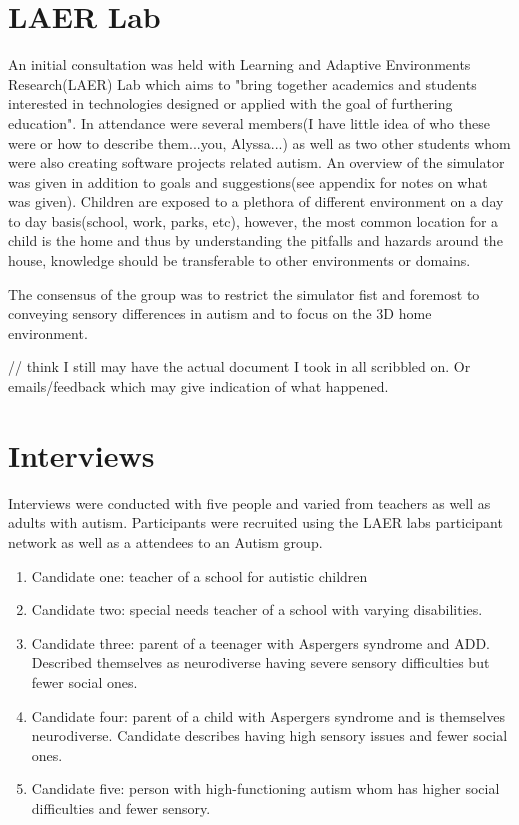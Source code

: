 \documentclass[11pt]{report}
\begin{document}
\section{LAER Lab}
An initial consultation was held with Learning and Adaptive Environments Research(LAER) Lab which aims to "bring together academics and students interested in technologies designed or applied with the goal of furthering education". In attendance were several members(I have little idea of who these were or how to describe them...you, Alyssa...) as well as two other students whom were also creating software projects related autism. An overview of the simulator was given in addition to goals and suggestions(see appendix for notes on what was given). Children are exposed to a plethora of different environment on a day to day basis(school, work, parks, etc), however, the most common location for a child is the home and thus by understanding the pitfalls and hazards around the house, knowledge should be transferable to other environments or domains. 

The consensus of the group was to restrict the simulator fist and foremost to conveying sensory differences in autism and to focus on the 3D home environment.

// think I still may have the actual document I took in all scribbled on. Or emails/feedback which may give indication of what happened.

\section{Interviews}
Interviews were conducted with five people and varied from teachers as well as adults with autism. Participants were recruited using the LAER labs participant network as well as a attendees to an Autism group.

\begin{enumerate}
\item Candidate one: teacher of a school for autistic children
\item Candidate two: special needs teacher of a school with varying disabilities.
\item Candidate three: parent of a teenager with Aspergers syndrome and ADD. Described themselves as neurodiverse having severe sensory difficulties but fewer social ones.
\item Candidate four: parent of a child with Aspergers syndrome and is themselves neurodiverse. Candidate describes having high sensory issues and fewer social ones.
\item Candidate five: person with high-functioning autism whom has higher social difficulties and fewer sensory.
\end{enumerate}
\end{document}
